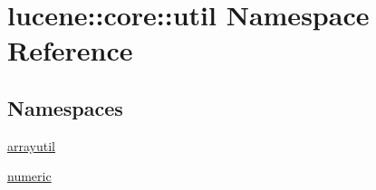 \hypertarget{namespacelucene_1_1core_1_1util}{}\section{lucene\+:\+:core\+:\+:util Namespace Reference}
\label{namespacelucene_1_1core_1_1util}
\subsection*{Namespaces}
\begin{DoxyCompactItemize}
\item 
 \mbox{\hyperlink{namespacelucene_1_1core_1_1util_1_1arrayutil}{arrayutil}}
\item 
 \mbox{\hyperlink{namespacelucene_1_1core_1_1util_1_1numeric}{numeric}}
\end{DoxyCompactItemize}

